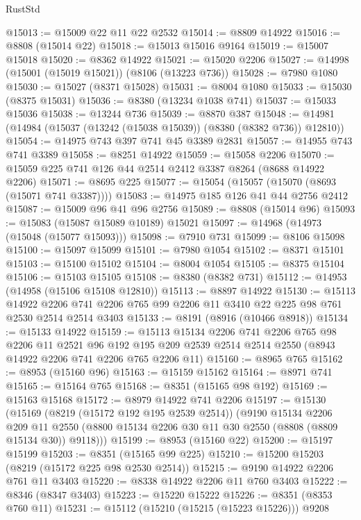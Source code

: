 \begin{lexlean}{RustStd}
\begin{coremodule}
@15013 := @15009 @22 @11 @22 @2532
@15014 := @8809 @14922
@15016 := @8808 (@15014 @22)
@15018 := @15013 @15016 @9164
@15019 := @15007 @15018
@15020 := @8362 @14922
@15021 := @15020 @2206
@15027 := @14998 (@15001 (@15019 @15021)) (@8106 (@13223 @736))
@15028 := @7980 @1080
@15030 := @15027 (@8371 @15028)
@15031 := @8004 @1080
@15033 := @15030 (@8375 @15031)
@15036 := @8380 (@13234 @1038 @741)
@15037 := @15033 @15036
@15038 := @13244 @736
@15039 := @8870 @387
@15048 := @14981 (@14984 (@15037 (@13242 (@15038 @15039)) (@8380 (@8382 @736)) @12810))
@15054 := @14975 @743 @397 @741 @45 @3389 @2831
@15057 := @14955 @743 @741 @3389
@15058 := @8251 @14922
@15059 := @15058 @2206
@15070 := @15059 @225 @741 @126 @44 @2514 @2412 @3387 @8264 (@8688 @14922 @2206)
@15071 := @8695 @225
@15077 := @15054 (@15057 (@15070 (@8693 (@15071 @741 @3387))))
@15083 := @14975 @185 @126 @41 @44 @2756 @2412
@15087 := @15009 @96 @41 @96 @2756
@15089 := @8808 (@15014 @96)
@15093 := @15083 (@15087 @15089 @10189) @15021
@15097 := @14968 (@14973 (@15048 (@15077 @15093)))
@15098 := @7910 @731
@15099 := @8106 @15098
@15100 := @15097 @15099
@15101 := @7980 @1054
@15102 := @8371 @15101
@15103 := @15100 @15102
@15104 := @8004 @1054
@15105 := @8375 @15104
@15106 := @15103 @15105
@15108 := @8380 (@8382 @731)
@15112 := @14953 (@14958 (@15106 @15108 @12810))
@15113 := @8897 @14922
@15130 := @15113
    @14922
    @2206
    @741
    @2206
    @765
    @99
    @2206
    @11
    @3410
    @22
    @225
    @98
    @761
    @2530
    @2514
    @2514
    @3403
@15133 := @8191 (@8916 (@10466 @8918))
@15134 := @15133 @14922
@15159 := @15113
    @15134
    @2206
    @741
    @2206
    @765
    @98
    @2206
    @11
    @2521
    @96
    @192
    @195
    @209
    @2539
    @2514
    @2514
    @2550
    (@8943 @14922 @2206 @741 @2206 @765 @2206 @11)
@15160 := @8965 @765
@15162 := @8953 (@15160 @96)
@15163 := @15159 @15162
@15164 := @8971 @741
@15165 := @15164 @765
@15168 := @8351 (@15165 @98 @192)
@15169 := @15163 @15168
@15172 := @8979 @14922 @741 @2206
@15197 := @15130
    (@15169
      (@8219 (@15172 @192 @195 @2539 @2514))
      (@9190
        @15134
        @2206
        @209
        @11
        @2550
        (@8800 @15134 @2206 @30 @11 @30 @2550 (@8808 (@8809 @15134 @30)) @9118)))
@15199 := @8953 (@15160 @22)
@15200 := @15197 @15199
@15203 := @8351 (@15165 @99 @225)
@15210 := @15200 @15203 (@8219 (@15172 @225 @98 @2530 @2514))
@15215 := @9190 @14922 @2206 @761 @11 @3403
@15220 := @8338 @14922 @2206 @11 @760 @3403
@15222 := @8346 (@8347 @3403)
@15223 := @15220 @15222
@15226 := @8351 (@8353 @760 @11)
@15231 := @15112 (@15210 (@15215 (@15223 @15226))) @9208

\end{coremodule}
\end{lexlean}
